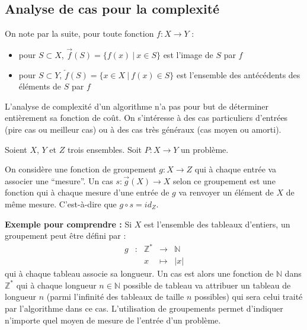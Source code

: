 \documentclass[../../../main.tex]{subfiles}
\begin{document}
\subsection{Analyse de cas pour la complexité}
On note par la suite, pour toute fonction $f:X\rightarrow Y$ :
\begin{itemize}
	\item pour $S\subset X$, $\overrightarrow{f}(S) = \{f(x)\ |\ x\in S\}$ est l'image de $S$ par $f$
	\item pour $S\subset Y$, $\overleftarrow{f}(S) = \{x\in X\ |\ f(x)\in S\}$ est l'ensemble des antécédents des éléments de $S$ par $f$
\end{itemize}
L'analyse de complexité d'un algorithme n'a pas pour but de déterminer entièrement sa fonction de coût. On s'intéresse à des cas particuliers d'entrées (pire cas ou meilleur cas) ou à des cas très généraux (cas moyen ou amorti).
 {
	Soient $X$, $Y$ et $Z$ trois ensembles. Soit $P:X\rightarrow Y$ un problème.\newline

	On considère une fonction de groupement $g:X\rightarrow Z$ qui à chaque entrée va associer une ``mesure''. Un cas $s:\overrightarrow{g}(X)\rightarrow X$ selon ce groupement est une fonction qui à chaque mesure d'une entrée de $g$ va renvoyer un élément de $X$ de même mesure. C'est-à-dire que $g\circ s = id_Z$.	
}
\textbf{Exemple pour comprendre :} Si $X$ est l'ensemble des tableaux d'entiers, un groupement peut être défini par : 
$$
\begin{array}{lclcl}
g & : & \mathbb{Z}^* & \rightarrow & \mathbb{N} \\
  &   & x & \mapsto & |x|
\end{array}
$$
qui à chaque tableau associe sa longueur. Un cas est alors une fonction de $\mathbb{N}$ dans $\mathbb{Z}^*$ qui à chaque longueur $n\in\mathbb{N}$ possible de tableau va attribuer un tableau de longueur $n$ (parmi l'infinité des tableaux de taille $n$ possibles) qui sera celui traité par l'algorithme dans ce cas.\newline
L'utilisation de groupements permet d'indiquer n'importe quel moyen de mesure de l'entrée d'un problème.
\end{document}
